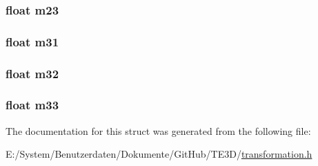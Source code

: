 \hypertarget{struct_t_e3_d___matrix3x3f_a777da9b73eb3d9a5ef1b5c2d54daf90e}{
\subsubsection[{m23}]{\setlength{\rightskip}{0pt plus 5cm}float m23}}\label{struct_t_e3_d___matrix3x3f_a777da9b73eb3d9a5ef1b5c2d54daf90e}
\hypertarget{struct_t_e3_d___matrix3x3f_af66b0b91043ff95a9ef5af104b82a25b}{
\subsubsection[{m31}]{\setlength{\rightskip}{0pt plus 5cm}float m31}}\label{struct_t_e3_d___matrix3x3f_af66b0b91043ff95a9ef5af104b82a25b}
\hypertarget{struct_t_e3_d___matrix3x3f_a94bf9c417b8241a4fea0783bd56c5466}{
\subsubsection[{m32}]{\setlength{\rightskip}{0pt plus 5cm}float m32}}\label{struct_t_e3_d___matrix3x3f_a94bf9c417b8241a4fea0783bd56c5466}
\hypertarget{struct_t_e3_d___matrix3x3f_a869382309bd500b986d2449b9f3ff04d}{
\subsubsection[{m33}]{\setlength{\rightskip}{0pt plus 5cm}float m33}}\label{struct_t_e3_d___matrix3x3f_a869382309bd500b986d2449b9f3ff04d}


The documentation for this struct was generated from the following file\-:\begin{DoxyCompactItemize}
\item 
E\-:/\-System/\-Benutzerdaten/\-Dokumente/\-Git\-Hub/\-T\-E3\-D/\hyperlink{transformation_8h}{transformation.\-h}\end{DoxyCompactItemize}
